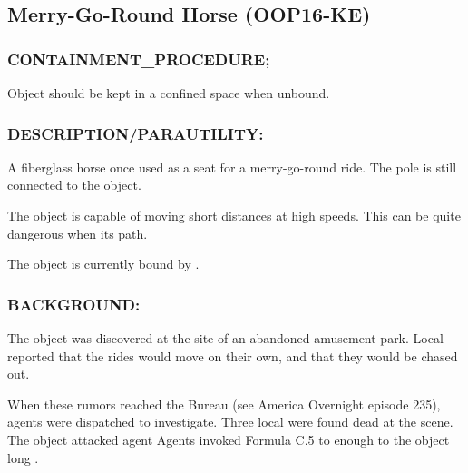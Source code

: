 \subsection*{Merry-Go-Round Horse (OOP16-KE)}
\subsubsection*{CONTAINMENT_PROCEDURE;}
\par Object should be kept in a confined
space when unbound.
\subsubsection*{DESCRIPTION/PARAUTILITY:}
\par A fiberglass horse once used as a seat
for a merry-go-round ride. The pole is
still connected to the object.
\par The object is capable of moving short distances at high speeds.
This can be quite dangerous when  its path.
\par The object is currently bound by .
\subsubsection*{BACKGROUND:}
The object was discovered at the site of an abandoned amusement park. Local  reported that the rides would move on their own, and that they would be chased out.
\par When these rumors reached the Bureau (see America Overnight
episode 235), agents were dispatched to investigate. Three local 
were found dead at the scene. The object attacked agent 
Agents invoked Formula C.5 to  enough to the object long .